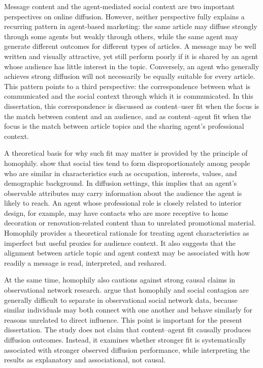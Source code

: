 Message content and the agent-mediated social context are two important perspectives on online diffusion. However, neither perspective fully explains a recurring pattern in agent-based marketing: the same article may diffuse strongly through some agents but weakly through others, while the same agent may generate different outcomes for different types of articles. A message may be well written and visually attractive, yet still perform poorly if it is shared by an agent whose audience has little interest in the topic. Conversely, an agent who generally achieves strong diffusion will not necessarily be equally suitable for every article. This pattern points to a third perspective: the correspondence between what is communicated and the social context through which it is communicated. In this dissertation, this correspondence is discussed as content–user fit when the focus is the match between content and an audience, and as content–agent fit when the focus is the match between article topics and the sharing agent's professional context.

A theoretical basis for why such fit may matter is provided by the principle of homophily. \textcite{mcpherson2001} show that social ties tend to form disproportionately among people who are similar in characteristics such as occupation, interests, values, and demographic background. In diffusion settings, this implies that an agent's observable attributes may carry information about the audience the agent is likely to reach. An agent whose professional role is closely related to interior design, for example, may have contacts who are more receptive to home decoration or renovation-related content than to unrelated promotional material. Homophily provides a theoretical rationale for treating agent characteristics as imperfect but useful proxies for audience context. It also suggests that the alignment between article topic and agent context may be associated with how readily a message is read, interpreted, and reshared.

At the same time, homophily also cautions against strong causal claims in observational network research. \textcite{shalizi2011} argue that homophily and social contagion are generally difficult to separate in observational social network data, because similar individuals may both connect with one another and behave similarly for reasons unrelated to direct influence. This point is important for the present dissertation. The study does not claim that content–agent fit causally produces diffusion outcomes. Instead, it examines whether stronger fit is systematically associated with stronger observed diffusion performance, while interpreting the results as explanatory and associational, not causal.


